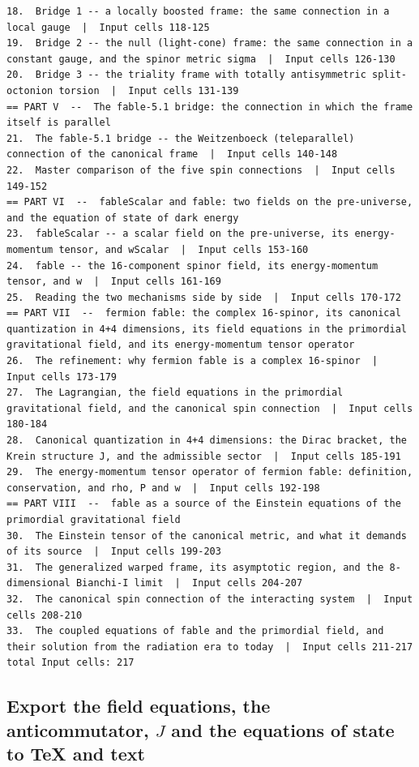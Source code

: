 \begin{Verbatim}[fontsize=\scriptsize]
18.  Bridge 1 -- a locally boosted frame: the same connection in a local gauge  |  Input cells 118-125
19.  Bridge 2 -- the null (light-cone) frame: the same connection in a constant gauge, and the spinor metric sigma  |  Input cells 126-130
20.  Bridge 3 -- the triality frame with totally antisymmetric split-octonion torsion  |  Input cells 131-139
== PART V  --  The fable-5.1 bridge: the connection in which the frame itself is parallel
21.  The fable-5.1 bridge -- the Weitzenboeck (teleparallel) connection of the canonical frame  |  Input cells 140-148
22.  Master comparison of the five spin connections  |  Input cells 149-152
== PART VI  --  fableScalar and fable: two fields on the pre-universe, and the equation of state of dark energy
23.  fableScalar -- a scalar field on the pre-universe, its energy-momentum tensor, and wScalar  |  Input cells 153-160
24.  fable -- the 16-component spinor field, its energy-momentum tensor, and w  |  Input cells 161-169
25.  Reading the two mechanisms side by side  |  Input cells 170-172
== PART VII  --  fermion fable: the complex 16-spinor, its canonical quantization in 4+4 dimensions, its field equations in the primordial gravitational field, and its energy-momentum tensor operator
26.  The refinement: why fermion fable is a complex 16-spinor  |  Input cells 173-179
27.  The Lagrangian, the field equations in the primordial gravitational field, and the canonical spin connection  |  Input cells 180-184
28.  Canonical quantization in 4+4 dimensions: the Dirac bracket, the Krein structure J, and the admissible sector  |  Input cells 185-191
29.  The energy-momentum tensor operator of fermion fable: definition, conservation, and rho, P and w  |  Input cells 192-198
== PART VIII  --  fable as a source of the Einstein equations of the primordial gravitational field
30.  The Einstein tensor of the canonical metric, and what it demands of its source  |  Input cells 199-203
31.  The generalized warped frame, its asymptotic region, and the 8-dimensional Bianchi-I limit  |  Input cells 204-207
32.  The canonical spin connection of the interacting system  |  Input cells 208-210
33.  The coupled equations of fable and the primordial field, and their solution from the radiation era to today  |  Input cells 211-217
total Input cells: 217
\end{Verbatim}

\subsection{Export the field equations, the anticommutator, \texorpdfstring{$J$}{J} and the equations of state to TeX and text}
\label{sec:11.5}

